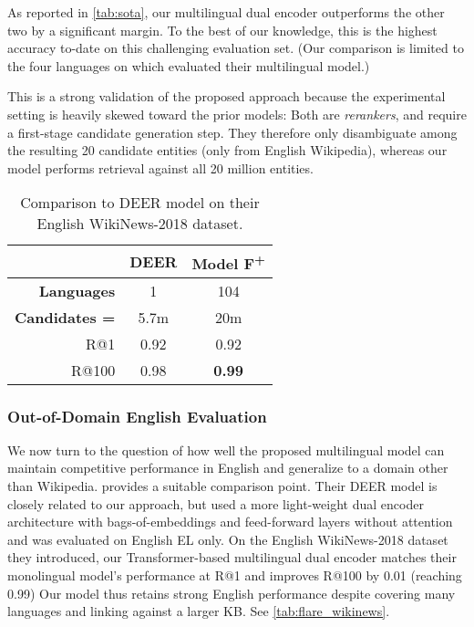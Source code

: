 \documentclass[11pt,a4paper]{article}
\begin{document}
As reported in \autoref{tab:sota}, our multilingual dual encoder outperforms the other two by a significant margin.
To the best of our knowledge, this is the highest accuracy to-date on this challenging evaluation set. (Our comparison is limited to the four languages on which  evaluated their multilingual model.)

This is a strong validation of the proposed approach because the experimental setting is heavily skewed toward the prior models:
Both are \emph{rerankers}, and require a first-stage candidate generation step.
They therefore only disambiguate among the resulting 20 candidate entities (only from English Wikipedia), whereas our model performs retrieval against all 20 million entities.


\begin{table}
\centering
\begin{tabular}{r cc} \toprule
 & \textbf{DEER} &  \textbf{Model F\textsuperscript{+}} \\ \midrule
\textbf{Languages} & 1 & 104 \\ 
\textbf{Candidates = } & 5.7m & 20m \\ \midrule
R@1    & 0.92 & 0.92 \\
R@100  & 0.98 & \textbf{0.99} \\ \bottomrule
\end{tabular}
\caption{Comparison to DEER model \citep{gillick-etal-2019-learning} on their English WikiNews-2018 dataset.
\label{tab:flare_wikinews}}
\end{table}

\subsubsection{Out-of-Domain English Evaluation}\label{sec:eval_english}
We now turn to the question of how well the proposed multilingual model can maintain competitive performance in English and generalize to a domain other than Wikipedia.
 provides a suitable comparison point.
Their DEER model is closely related to our approach, but used a more light-weight dual encoder architecture with bags-of-embeddings and feed-forward layers without attention and was evaluated on English EL only.
On the English WikiNews-2018 dataset they introduced, our Transformer-based multilingual dual encoder matches their monolingual model's performance at R@1 and improves R@100 by 0.01 (reaching 0.99)
Our model thus retains strong English performance despite covering many languages and linking against a larger KB. See \autoref{tab:flare_wikinews}.
\end{document}
